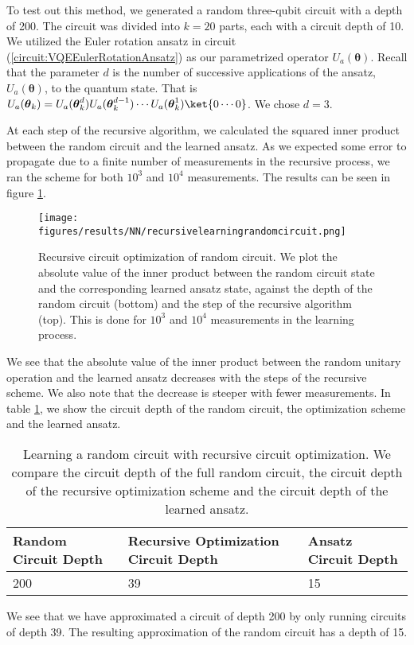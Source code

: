 To test out this method, we generated a random three-qubit circuit with a depth of 200.
The circuit was divided into $k=20$ parts, each with a circuit depth of 10. We utilized the Euler rotation ansatz in circuit (\ref{circuit:VQEEulerRotationAnsatz}) as our parametrized operator $U_a(\boldsymbol{\theta})$. Recall that the parameter $d$ is the number of successive applications of the ansatz, $U_a(\boldsymbol{\theta})$, to the quantum state. That is $U_a(\boldsymbol{\theta}_k) = U_a(\boldsymbol{\theta}
^d_k)U_a(\boldsymbol{\theta}^{d-1}_k)\cdots U_a(\boldsymbol{\theta}^1_k) \ket{0\cdots 0}$. We chose $d=3$.

At each step of the recursive algorithm, we calculated the squared inner product between the random circuit and the learned ansatz.
As we expected some error to propagate due to a finite number of measurements in the recursive process, we ran the scheme for both $10^3$ and $10^4$ measurements. The results can be seen in figure \ref{fig:RecursiveCircuitOptimizationRandomCircuit}.
\begin{figure}[H]
    \centering
    \texttt{[image: figures/results/NN/recursivelearningrandomcircuit.png]}
    \caption{Recursive circuit optimization of random circuit. We plot the absolute value of the inner product between the random circuit state and the corresponding learned ansatz state, against the depth of the random circuit (bottom) and the step of the recursive algorithm (top). This is done for $10^3$ and $10^4$ measurements in the learning process.}
    \label{fig:RecursiveCircuitOptimizationRandomCircuit}
\end{figure}
We see that the absolute value of the inner product between the random unitary operation and the learned ansatz decreases with the steps of the recursive scheme. We also note that the decrease is steeper with fewer measurements.
In table \ref{tab:RecursiveOptimizationRandomCircuit}, we show the circuit depth of the random circuit, the optimization scheme and the learned ansatz.
\begin{table}[H]
\centering
\caption{Learning a random circuit with recursive circuit optimization. We compare the circuit depth of the full random circuit, the circuit depth of the recursive optimization scheme and the circuit depth of the learned ansatz.}
\label{tab:RecursiveOptimizationRandomCircuit}
\begin{tabular}{|l|l|l|}
\hline
Random Circuit Depth & Recursive Optimization Circuit Depth & Ansatz Circuit Depth \\ \hline
200                  & 39                           & 15  \\\hline
\end{tabular}
\end{table}
We see that we have approximated a circuit of depth 200 by only running circuits of depth 39. The resulting approximation of the random circuit has a depth of 15. 

